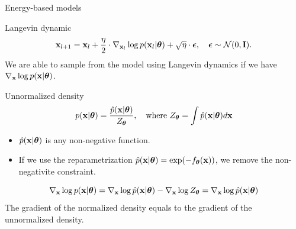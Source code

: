 \begin{frame}{Energy-based models}
	\begin{block}{Langevin dynamic}
		\vspace{-0.3cm}
		\[
			\mathbf{x}_{l + 1} = \mathbf{x}_l + \frac{\eta}{2} \cdot \nabla_{\mathbf{x}_l} \log p(\mathbf{x}_l | \boldsymbol{\theta}) + \sqrt{\eta} \cdot \boldsymbol{\epsilon}, \quad \boldsymbol{\epsilon} \sim \mathcal{N}(0, \mathbf{I}).
		\]
		We are able to sample from the model using Langevin dynamics if we have $\nabla_{\mathbf{x}}\log p(\mathbf{x}| \boldsymbol{\theta})$.
	\end{block}
	\begin{block}{Unnormalized density}
		\vspace{-0.2cm}
		\[
			p(\mathbf{x} | \boldsymbol{\theta}) = \frac{\hat{p}(\mathbf{x} | \boldsymbol{\theta})}{Z_{\boldsymbol{\theta}}}, \quad \text{where } Z_{\boldsymbol{\theta}} = \int \hat{p}(\mathbf{x} | \boldsymbol{\theta}) d \mathbf{x}
		\]
		\vspace{-0.3cm}
		\begin{itemize}
			\item $\hat{p}(\mathbf{x} | \boldsymbol{\theta})$ is any non-negative function. \\
			\item If we use the reparametrization $\hat{p}(\mathbf{x} | \boldsymbol{\theta}) = \exp(-f_{\boldsymbol{\theta}}(\mathbf{x}))$, we remove the non-negativite constraint.
		\end{itemize}
		\[
			\nabla_{\mathbf{x}} \log p(\mathbf{x} | \boldsymbol{\theta}) = \nabla_{\mathbf{x}} \log \hat{p}(\mathbf{x} | \boldsymbol{\theta}) - \nabla_{\mathbf{x}} \log Z_{\boldsymbol{\theta}} = \nabla_{\mathbf{x}} \log \hat{p}(\mathbf{x} | \boldsymbol{\theta})
		\]
		The gradient of the normalized density equals to the gradient of the unnormalized density.
	\end{block}
\end{frame}
